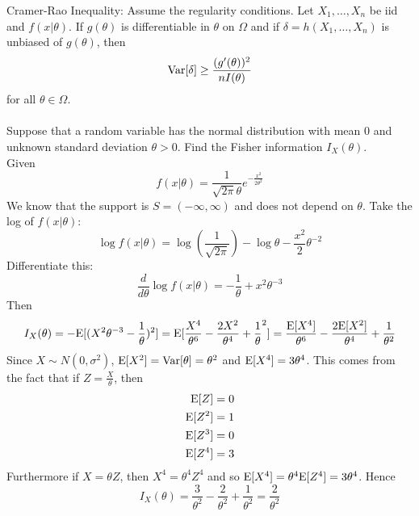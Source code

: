 \documentclass[12pt]{article}
\begin{document}
Cramer-Rao Inequality: Assume the regularity conditions. Let $X_1,\dots,X_n$ be iid and $f(x | \theta)$. If $g(\theta)$ is differentiable in $\theta$ on $\Omega$ and if $\delta = h(X_1,\dots,X_n)$ is unbiased of $g(\theta)$,  then $$ \mathrm{Var}[ \delta ] \geq \frac{(g'(\theta))^2}{nI(\theta)} $$ for all $\theta \in \Omega$. \\~\\
Suppose that a random variable has the normal distribution with mean $0$ and unknown standard deviation $\theta > 0$. Find the Fisher information $I_X(\theta)$. \\
Given $$f(x|\theta) = \frac{1}{\sqrt{2\pi} \theta} e^{-\frac{x^2}{2\theta^2}}$$ We know that the support is $S = (-\infty,\infty)$ and does not depend on $\theta$. Take the log of $f(x|\theta)$: $$ \log f(x | \theta) = \log (\frac{1}{\sqrt{2\pi}}) - \log \theta - \frac{x^2}{2}\theta^{-2} $$ Differentiate this: $$ \frac{d}{d\theta} \log f(x | \theta) = -\frac{1}{\theta} + x^2\theta^{-3} $$ Then $$ I_X(\theta) = -\mathrm{E}[ (X^2 \theta^{-3} - \frac{1}{\theta})^2 ] = \mathrm{E}[ \frac{X^4}{\theta^6} - \frac{2X^2}{\theta^4} + \frac{1}{\theta}^2 ] = \frac{\mathrm{E}[ X^4 ]}{\theta^6} - \frac{2\mathrm{E}[ X^2 ]}{\theta^4} + \frac{1}{\theta^2} $$ 
Since $X \sim N(0,\sigma^2)$, $\mathrm{E}[ X^2 ] = \mathrm{Var}[ \theta ] = \theta^2$ and $\mathrm{E}[ X^4 ] = 3\theta^4$. This comes from the fact that if $Z = \frac{X}{\theta}$, then $$ \begin{aligned} \mathrm{E}[ Z ] &= 0 \\ \mathrm{E}[ Z^2 ] &= 1 \\ \mathrm{E}[ Z^3 ] &= 0 \\ \mathrm{E}[ Z^4 ] &= 3 \end{aligned} $$ Furthermore if $X = \theta Z$, then $X^4 = \theta^4Z^4$ and so $\mathrm{E}[ X^4 ] = \theta^4\mathrm{E}[ Z^4 ] = 3\theta^4$. Hence $$I_X(\theta) = \frac{3}{\theta^2} - \frac{2}{\theta^2} + \frac{1}{\theta^2} = \frac{2}{\theta^2} $$ 
\end{document}
